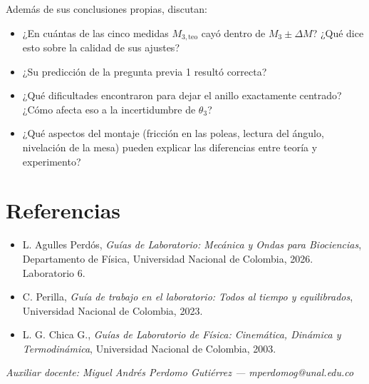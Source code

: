 \documentclass[11pt, letterpaper]{article}
\begin{document}
	Además de sus conclusiones propias, discutan:
	
	\begin{itemize}
		\item ¿En cuántas de las cinco medidas $M_{3,\text{teo}}$ cayó dentro
		de $M_3 \pm \Delta M$? ¿Qué dice esto sobre la calidad de sus ajustes?
		\item ¿Su predicción de la pregunta previa 1 resultó correcta?
		\item ¿Qué dificultades encontraron para dejar el anillo exactamente
		centrado? ¿Cómo afecta eso a la incertidumbre de $\theta_3$?
		\item ¿Qué aspectos del montaje (fricción en las poleas, lectura del
		ángulo, nivelación de la mesa) pueden explicar las diferencias entre
		teoría y experimento?
	\end{itemize}
	
	\section{Referencias}
	
	\begin{itemize}
		\item L. Agulles Perdós, \emph{Guías de Laboratorio: Mecánica y Ondas
			para Biociencias}, Departamento de Física, Universidad Nacional de
		Colombia, 2026. Laboratorio 6.
		\item C. Perilla, \emph{Guía de trabajo en el laboratorio: Todos al
			tiempo y equilibrados}, Universidad Nacional de Colombia, 2023.
		\item L. G. Chica G., \emph{Guías de Laboratorio de Física:
			Cinemática, Dinámica y Termodinámica}, Universidad Nacional de
		Colombia, 2003.
	\end{itemize}
	
	\vfill
	\noindent
	{\footnotesize \textit{Auxiliar docente: Miguel Andrés Perdomo Gutiérrez
			--- mperdomog@unal.edu.co}}
	
\end{document}
